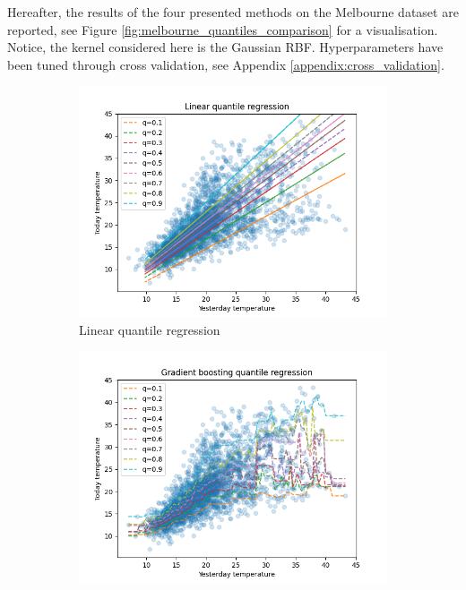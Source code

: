 Hereafter, the results of the four presented methods on the Melbourne dataset are reported, see Figure \ref{fig:melbourne_quantiles_comparison} for a visualisation. Notice, the kernel considered here is the Gaussian RBF. Hyperparameters have been tuned through cross validation, see Appendix \ref{appendix:cross_validation}.
\begin{figure}[!h]
    \begin{subfigure}[b]{0.5\linewidth}
      \centering
      \includegraphics[width=1.1\textwidth]{images/melbourne_linear_quantile_regression.png} 
      \caption{Linear quantile regression} 
      \label{fig:melbourne_linear_quantile_regression} 
      \vspace{4ex}
    \end{subfigure}%
    \begin{subfigure}[b]{0.5\linewidth}
      \centering
      \includegraphics[width=1.1\textwidth]{images/melbourne_gradient_boosting_quantile_regression.png} 

\end{subfigure}
\end{figure}
